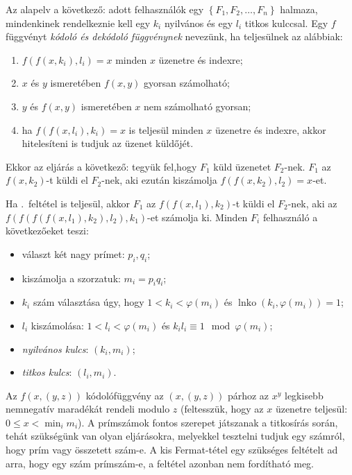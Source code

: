 \documentclass[DIV=15,appendixprefix]{scrreprt}
\theoremstyle{definition}
\theoremstyle{remark}
\DeclareMathOperator{\lnko}{lnko}
\begin{document}
Az alapelv a következő: adott felhasználók egy $ \left\{ F_{ 1 },{} F_{ 2 },{} \ldots,{} F_{ n }
\right\} $ halmaza, mindenkinek rendelkeznie kell egy $ k_{ i } $ nyilvános és egy $ l_{ i } $
titkos kulccsal. Egy $ f $ függvényt \emph{kódoló és dekódoló függvénynek} nevezünk, ha teljesülnek
az alábbiak:
	\begin{enumerate}
		\item $ f \left( f \left( x,{} k_{ i } \right), {} l_{ i } \right) = x $ minden $ x $
			üzenetre és indexre;
		\item $ x $ és $ y $ ismeretében $ f \left( x,{} y \right) $ gyorsan számolható;
		\item $ y $ és $ f \left( x,{} y \right) $ ismeretében $ x $ nem számolható gyorsan;
		\item\label{itm:felt} ha $ f \left( f \left( x,{} l_{ i } \right), {} k_{ i } \right) = x $
			is teljesül minden $x$ üzenetre és indexre, akkor hitelesíteni is tudjuk az üzenet
			küldőjét.
	\end{enumerate}
Ekkor az eljárás a következő: tegyük fel,hogy $ F_{ 1 } $ küld üzenetet $ F_{ 2 }$-nek. $ F_{ 1 } $
az $ f \left( x,{} k_{ 2 } \right) $-t küldi el $F_{ 2 } $-nek, aki ezután kiszámolja $ f \left( f
\left( x,{} k_{ 2 } \right), {} l_{ 2 } \right)=x $-et.

Ha .~feltétel is teljesül, akkor $ F_{ 1 } $ az $ f \left( f \left( x,{} l_{ 1 }
\right), {} k_{ 2 } \right) $-t küldi el $F_{ 2 } $-nek, aki az $ f \left( f \left( f \left( f
\left( x,{} l_{ 1 } \right), {} k_{ 2 } \right),{} l_{ 2 } \right),{} k_{ 1 } \right) $-et számolja
ki.
%
Minden $ F_{ i } $ felhasználó a következőeket teszi:
\begin{itemize}
	\item választ két nagy prímet: $ p_{ i },{} q_{ i }$;
	\item kiszámolja a szorzatuk: $ m_{ i } =  p_{ i } q_{ i } $;
	\item $ k_{ i } $ szám választása úgy, hogy $ 1 < k_{ i } < \varphi \left( m_{ i } \right) $ és
		$\lnko \left( k_{ i },{} \varphi \left( m_{ i } \right) \right) = 1 $;
	\item $ l_{ i } $ kiszámolása: $ 1 < l_{ i } < \varphi \left( m_{ i } \right) $ és $ k_{ i }
		l_{ i } \equiv 1 \mod{ \varphi \left( m_{ i } \right) }$;
	\item \emph{nyilvános kulcs}: $ \left( k_{ i },{} m_{ i } \right) $;
	\item \emph{titkos kulcs}: $ \left( l_{ i },{} m_{ i } \right) $.
\end{itemize}
Az $ f \left( x,{} \left( y,{} z \right) \right) $ kódolófüggvény az $ \left( x,{} \left( y,{} z
\right) \right) $ párhoz az $ x^{ y } $ legkisebb nemnegatív maradékát rendeli modulo $ z $
(feltesszük, hogy az $ x $ üzenetre teljesül: $ 0 \le x < \min_{ i } m_{ i } $).
%
A prímszámok fontos szerepet játszanak a titkosírás során, tehát szükségünk van olyan eljárásokra,
melyekkel tesztelni tudjuk egy számról, hogy prím vagy összetett szám-e. A kis Fermat-tétel egy
szükséges feltételt ad arra, hogy egy szám prímszám-e, a feltétel azonban nem fordítható meg.
\end{document}
